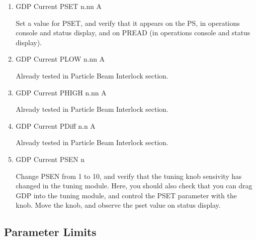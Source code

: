 \documentclass[11pt]{book}		%
\begin{document}
\begin{enumerate}
 \item GDP Current PSET  n.nn A

\color{red}
Set a value for PSET, and verify that it appears on the PS, in operations console and status display, and on PREAD (in operations console and status display).
\color{black}

 \item GDP Current PLOW  n.nn A

\color{red}
Already tested in Particle Beam Interlock section.
\color{black}

 \item GDP Current PHIGH n.nn A

\color{red}
Already tested in Particle Beam Interlock section.
\color{black}

 \item GDP Current PDiff n.n A

\color{red}
Already tested in Particle Beam Interlock section.
\color{black}

 \item GDP Current PSEN  n

\color{red}
Change PSEN from 1 to 10, and verify that the tuning knob sensivity has changed in the tuning module. Here, you should also check that you can drag GDP into the tuning module, and control the PSET parameter with the knob. Move the knob, and observe the pset value on status display.
\color{black}

\end{enumerate}


\subsection{Parameter Limits}
\end{document}
